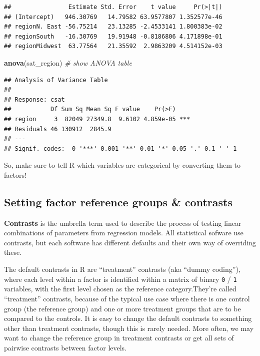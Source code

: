 \documentclass[
]{book}
\newenvironment{Shaded}{\begin{snugshade}}{\end{snugshade}}
\newcommand{\CommentTok}[1]{\textcolor[rgb]{0.56,0.35,0.01}{\textit{#1}}}
\newcommand{\KeywordTok}[1]{\textcolor[rgb]{0.13,0.29,0.53}{\textbf{#1}}}
\newcommand{\NormalTok}[1]{#1}
\begin{document}
\begin{verbatim}
##                Estimate Std. Error    t value     Pr(>|t|)
## (Intercept)   946.30769   14.79582 63.9577807 1.352577e-46
## regionN. East -56.75214   23.13285 -2.4533141 1.800383e-02
## regionSouth   -16.30769   19.91948 -0.8186806 4.171898e-01
## regionMidwest  63.77564   21.35592  2.9863209 4.514152e-03
\end{verbatim}

\begin{Shaded}
\begin{Highlighting}[]
  \KeywordTok{anova}\NormalTok{(sat\_region) }\CommentTok{\# show ANOVA table}
\end{Highlighting}
\end{Shaded}

\begin{verbatim}
## Analysis of Variance Table
## 
## Response: csat
##           Df Sum Sq Mean Sq F value    Pr(>F)    
## region     3  82049 27349.8  9.6102 4.859e-05 ***
## Residuals 46 130912  2845.9                      
## ---
## Signif. codes:  0 '***' 0.001 '**' 0.01 '*' 0.05 '.' 0.1 ' ' 1
\end{verbatim}

So, make sure to tell R which variables are categorical by converting them to factors!

\hypertarget{setting-factor-reference-groups-contrasts}{%
\subsection{Setting factor reference groups \& contrasts}\label{setting-factor-reference-groups-contrasts}}

\textbf{Contrasts} is the umbrella term used to describe the process of testing linear combinations of parameters from regression models. All statistical sofware use contrasts, but each software has different defaults and their own way of overriding these.

The default contrasts in R are ``treatment'' contrasts (aka ``dummy coding''), where each level within a factor is identified within a matrix of binary \texttt{0} / \texttt{1} variables, with the first level chosen as the reference category.They're called ``treatment'' contrasts, because of the typical use case where there is one control group (the reference group) and one or more treatment groups that are to be compared to the controls. It is easy to change the default contrasts to something other than treatment contrasts, though this is rarely needed. More often, we may want to change the reference group in treatment contrasts or get all sets of pairwise contrasts between factor levels.
\end{document}
